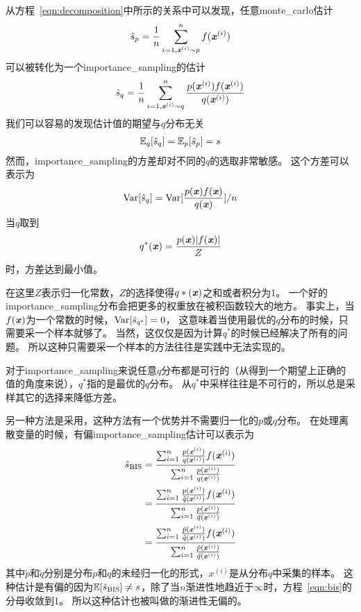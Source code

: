 从方程~\ref{eqn:decomposition}中所示的关系中可以发现，任意\gls{monte_carlo}估计
\begin{align}
\hat{s}_p = \frac{1}{n}\sum_{i=1,\boldsymbol{\mathit{x}}^{(i)}\sim p}^{n}f(\boldsymbol{\mathit{x}}^{(i)})
\end{align}
可以被转化为一个\gls{importance_sampling}的估计
\begin{align}
\hat{s}_q = \frac{1}{n}\sum_{i=1,\boldsymbol{\mathit{x}}^{(i)}\sim q}^{n}\frac{p(\boldsymbol{\mathit{x}}^{(i)})f(\boldsymbol{\mathit{x}}^{(i)})}{q(\boldsymbol{\mathit{x}}^{(i)})}
\end{align}
我们可以容易的发现估计值的期望与$q$分布无关
\begin{align}
\mathbb{E}_q [\hat{s}_q] = \mathbb{E}_p [\hat{s}_p] = s
\end{align}
然而，\gls{importance_sampling}的方差却对不同的$q$的选取非常敏感。
这个方差可以表示为
\begin{align}
\label{eqn:variance_of_is}
\text{Var} [\hat{s}_q] = \text{Var} [\frac{p(\boldsymbol{\mathit{x}})f(\boldsymbol{\mathit{x}})}{q(\boldsymbol{\mathit{x}})}]/n
\end{align}
当$q$取到
\begin{align}
q^*(\boldsymbol{\mathit{x}}) = \frac{p(\boldsymbol{\mathit{x}})\vert f(\boldsymbol{\mathit{x}})\vert}{Z}
\end{align}
时，方差达到最小值。


在这里$Z$表示归一化常数，$Z$的选择使得$q*(\boldsymbol{\mathit{x}})$之和或者积分为1。
一个好的\gls{importance_sampling}分布会把更多的权重放在被积函数较大的地方。
事实上，当$f(\boldsymbol{\mathit{x}})$为一个常数的时候，$\text{Var}[\hat{s}_{q^*}]=0$， 这意味着当使用最优的$q$分布的时候，只需要采一个样本就够了。
当然，这仅仅是因为计算$q^*$的时候已经解决了所有的问题。
所以这种只需要采一个样本的方法往往是实践中无法实现的。

对于\gls{importance_sampling}来说任意$q$分布都是可行的（从得到一个期望上正确的值的角度来说），$q^*$指的是最优的$q$分布。
从$q^*$中采样往往是不可行的，所以总是采样其它的选择来降低方差。



另一种方法是采用，这种方法有一个优势并不需要归一化的$p$或$q$分布。
在处理离散变量的时候，有偏\gls{importance_sampling}估计可以表示为
\begin{align}
\label{eqn:bis}
\hat{s}_{\text{BIS}} & = \frac{\sum_{i=1}^{n} \frac{p(\boldsymbol{\mathit{x}}^{(i)})}{q(\boldsymbol{\mathit{x}}^{(i)})} f(\boldsymbol{\mathit{x}}^{(i)})}{\sum_{i=1}^{n}\frac{p(\boldsymbol{\mathit{x}}^{(i)})}{q(\boldsymbol{\mathit{x}}^{(i)})}} \\
& = \frac{\sum_{i=1}^{n} \frac{p(\boldsymbol{\mathit{x}}^{(i)})}{\tilde{q}(\boldsymbol{\mathit{x}}^{(i)})} f(\boldsymbol{\mathit{x}}^{(i)})}{\sum_{i=1}^{n}\frac{p(\boldsymbol{\mathit{x}}^{(i)})}{\tilde{q}(\boldsymbol{\mathit{x}}^{(i)})}} \\
& = \frac{\sum_{i=1}^{n} \frac{\tilde{p}(\boldsymbol{\mathit{x}}^{(i)})}{\tilde{q}(\boldsymbol{\mathit{x}}^{(i)})} f(\boldsymbol{\mathit{x}}^{(i)})}{\sum_{i=1}^{n}\frac{\tilde{p}(\boldsymbol{\mathit{x}}^{(i)})}{\tilde{q}(\boldsymbol{\mathit{x}}^{(i)})}}
\end{align}
其中$\tilde{p}$和$\tilde{q}$分别是分布${p}$和${q}$的未经归一化的形式，$x^{(i)}$是从分布${q}$中采集的样本。
这种估计是有偏的因为$\mathbb{E}[\hat{s}_{\text{BIS}}]\neq s$，除了当$n$渐进性地趋近于$\infty$时，方程~\eqref{eqn:bis}的分母收敛到1。
所以这种估计也被叫做的渐进性无偏的。

